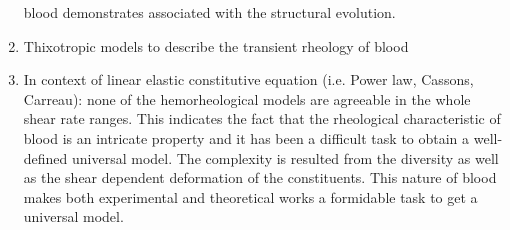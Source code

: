 \documentclass[11pt,letterpaper]{article}
\begin{document}
\begin{enumerate}
blood demonstrates associated with the structural evolution.
\item Thixotropic models to
describe the transient rheology of blood
\item In context of linear elastic constitutive equation (i.e. Power law, Cassons, Carreau): none of the hemorheological models are agreeable in the whole shear rate ranges. This indicates the fact that the rheological characteristic of blood is an intricate property and it has been a difficult task to obtain a well-defined universal model. The complexity is resulted from the diversity as well as the shear dependent deformation of the constituents. This nature of blood makes both experimental and theoretical works a formidable task to get a universal model.
\end{enumerate}


\newpage
\end{document}
